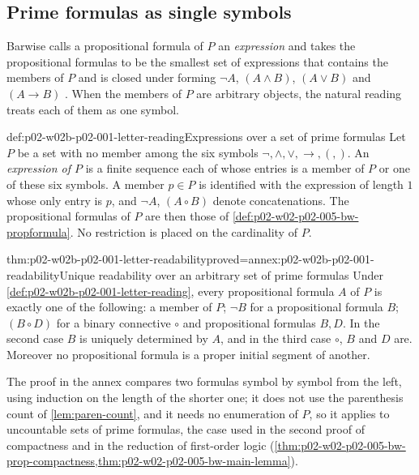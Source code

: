 \subsection{Prime formulas as single symbols}
\label{sec:p02-w02b-p02-001-letters}

Barwise calls a propositional formula of \(P\) an \emph{expression} and
takes the propositional formulas to be the smallest set of expressions that
contains the members of \(P\) and is closed under forming \(\neg A\),
\((A\land B)\), \((A\lor B)\) and \((A\to B)\)
\cite[ch.~A.1, \S4, p.~23]{Barwise1977FirstOrder}.  When the members of
\(P\) are arbitrary objects, the natural reading treats each of them as one
symbol.

\begin{hbconvention}{def:p02-w02b-p02-001-letter-reading}{Expressions over a set of prime formulas}
Let \(P\) be a set with no member among the six symbols
\(\neg,\land,\lor,\to,(,)\).  An \emph{expression of \(P\)} is a finite
sequence each of whose entries is a member of \(P\) or one of these six
symbols.  A member \(p\in P\) is identified with the expression of length
\(1\) whose only entry is \(p\), and \(\neg A\), \((A\circ B)\) denote
concatenations.  The propositional formulas of \(P\) are then those of
\cref{def:p02-w02-p02-005-bw-propformula}.  No restriction is placed on the
cardinality of \(P\).
\end{hbconvention}

\begin{hbtheorem}{thm:p02-w02b-p02-001-letter-readability}{proved=annex:p02-w02b-p02-001-readability}{Unique readability over an arbitrary set of prime formulas}
Under \cref{def:p02-w02b-p02-001-letter-reading}, every propositional
formula \(A\) of \(P\) is exactly one of the following: a member of \(P\);
\(\neg B\) for a propositional formula \(B\); \((B\circ D)\) for a binary
connective \(\circ\) and propositional formulas \(B,D\).  In the second case
\(B\) is uniquely determined by \(A\), and in the third case \(\circ\),
\(B\) and \(D\) are.  Moreover no propositional formula is a proper initial
segment of another.
\end{hbtheorem}

The proof in the annex compares two formulas symbol by symbol from the
left, using induction on the length of the shorter one; it does not use the
parenthesis count of \cref{lem:paren-count}, and it needs no enumeration of
\(P\), so it applies to uncountable sets of prime formulas, the case used in
the second proof of compactness and in the reduction of first-order logic
(\cref{thm:p02-w02-p02-005-bw-prop-compactness,thm:p02-w02-p02-005-bw-main-lemma}).

